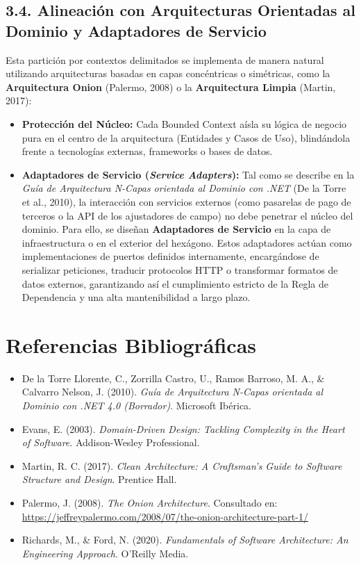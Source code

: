\documentclass[12pt,a4paper]{article}
\begin{document}
\subsection*{3.4. Alineación con Arquitecturas Orientadas al Dominio y Adaptadores de Servicio}
Esta partición por contextos delimitados se implementa de manera natural utilizando arquitecturas basadas en capas concéntricas o simétricas, como la \textbf{Arquitectura Onion} (Palermo, 2008) o la \textbf{Arquitectura Limpia} (Martin, 2017):
\begin{itemize}
    \item \textbf{Protección del Núcleo:} Cada Bounded Context aísla su lógica de negocio pura en el centro de la arquitectura (Entidades y Casos de Uso), blindándola frente a tecnologías externas, frameworks o bases de datos.
    \item \textbf{Adaptadores de Servicio (\textit{Service Adapters}):} Tal como se describe en la \textit{Guía de Arquitectura N-Capas orientada al Dominio con .NET} (De la Torre et al., 2010), la interacción con servicios externos (como pasarelas de pago de terceros o la API de los ajustadores de campo) no debe penetrar el núcleo del dominio. Para ello, se diseñan \textbf{Adaptadores de Servicio} en la capa de infraestructura o en el exterior del hexágono. Estos adaptadores actúan como implementaciones de puertos definidos internamente, encargándose de serializar peticiones, traducir protocolos HTTP o transformar formatos de datos externos, garantizando así el cumplimiento estricto de la Regla de Dependencia y una alta mantenibilidad a largo plazo.
\end{itemize}

\section*{Referencias Bibliográficas}
\begin{itemize}[leftmargin=*]
    \item De la Torre Llorente, C., Zorrilla Castro, U., Ramos Barroso, M. A., \& Calvarro Nelson, J. (2010). \textit{Guía de Arquitectura N-Capas orientada al Dominio con .NET 4.0 (Borrador)}. Microsoft Ibérica.
    \item Evans, E. (2003). \textit{Domain-Driven Design: Tackling Complexity in the Heart of Software}. Addison-Wesley Professional.
    \item Martin, R. C. (2017). \textit{Clean Architecture: A Craftsman's Guide to Software Structure and Design}. Prentice Hall.
    \item Palermo, J. (2008). \textit{The Onion Architecture}. Consultado en: \url{https://jeffreypalermo.com/2008/07/the-onion-architecture-part-1/}
    \item Richards, M., \& Ford, N. (2020). \textit{Fundamentals of Software Architecture: An Engineering Approach}. O'Reilly Media.
\end{itemize}
\end{document}
